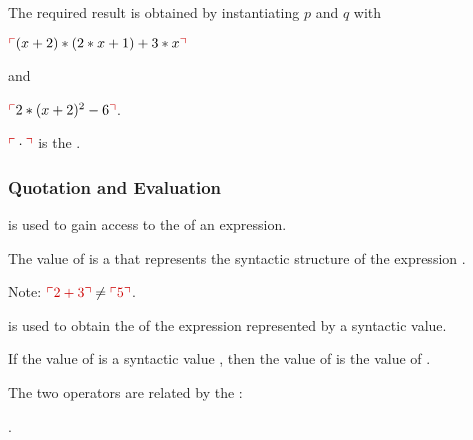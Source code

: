 \documentclass[t,12pt,numbers,fleqn]{beamer}
\begin{document}
\begin{frame}
\bigskip


\medskip

  \item<6-> The required result is obtained by instantiating $p$ and
    $q$ with

  \bi

    \item[] $\redsynbrack{(x + 2) * (2 * x + 1) + 3 * x}$ 

  \ei

  and

  \bi

    \item[] $\redsynbrack{2 * (x + 2)^2 - 6}$.

  \ei

\medskip

  $\redsynbrack{\cdot}$ is the .

\ei
\end{frame}


\begin{frame}
\frametitle{Quotation and Evaluation}
\bi

  \item {} is used to gain access to the
     of an expression.

  \bi

    \item The value of  is a  that represents the syntactic structure of the expression
      .

    \item Note: $\bred{\synbrack{2 + 3}} \not= \bred{\synbrack{5}}$.

  \ei

\pause
\medskip

  \item {} is used to obtain the  of
    the expression represented by a syntactic value.

  \bi

    \item If the value of  is a syntactic value ,
      then the value of  is the value of
      .

  \ei

\pause
\medskip

  \item The two operators are related by the :

  \bi

    \item[] .

  \ei

\ei
\end{frame}
\end{document}
